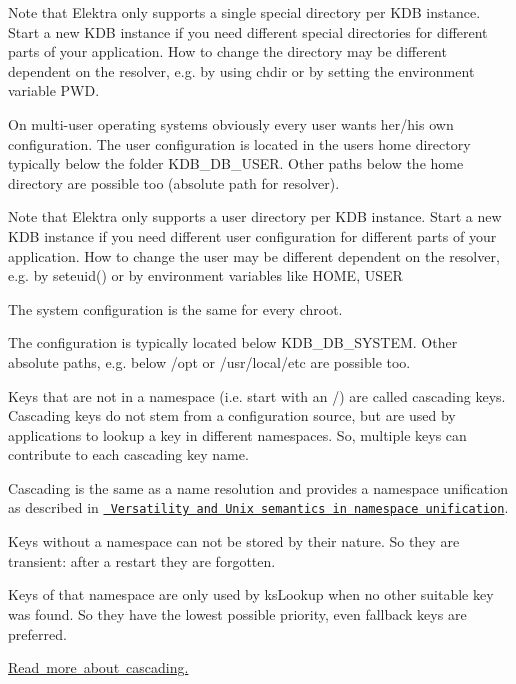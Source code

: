 Note that Elektra only supports a single special directory per K\+DB instance. Start a new K\+DB instance if you need different special directories for different parts of your application. How to change the directory may be different dependent on the resolver, e.\+g. by using chdir or by setting the environment variable {\ttfamily P\+WD}.

On multi-\/user operating systems obviously every user wants her/his own configuration. The user configuration is located in the users home directory typically below the folder {\ttfamily K\+D\+B\+\_\+\+D\+B\+\_\+\+U\+S\+ER.} Other paths below the home directory are possible too (absolute path for resolver).

Note that Elektra only supports a user directory per K\+DB instance. Start a new K\+DB instance if you need different user configuration for different parts of your application. How to change the user may be different dependent on the resolver, e.\+g. by {\ttfamily seteuid()} or by environment variables like {\ttfamily H\+O\+ME}, {\ttfamily U\+S\+ER}

The system configuration is the same for every chroot.

The configuration is typically located below {\ttfamily K\+D\+B\+\_\+\+D\+B\+\_\+\+S\+Y\+S\+T\+EM}. Other absolute paths, e.\+g. below {\ttfamily /opt} or {\ttfamily /usr/local/etc} are possible too.

Keys that are not in a namespace (i.\+e. start with an {\ttfamily /}) are called cascading keys. Cascading keys do not stem from a configuration source, but are used by applications to lookup a key in different namespaces. So, multiple keys can contribute to each cascading key name.

Cascading is the same as a name resolution and provides a namespace unification as described in \href{http://citeseerx.ist.psu.edu/viewdoc/summary?doi=10.1.1.81.7888}{\texttt{ Versatility and Unix semantics in namespace unification}}.

Keys without a namespace can not be stored by their nature. So they are transient\+: after a restart they are forgotten.

Keys of that namespace are only used by ks\+Lookup when no other suitable key was found. So they have the lowest possible priority, even fallback keys are preferred.

\mbox{\hyperlink{doc_help_elektra-cascading_md}{Read more about cascading.}} 